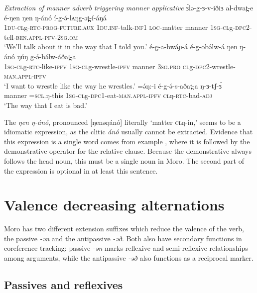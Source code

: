 \ea \textit{Extraction of manner adverb triggering manner applicative}
\ea \gll ɜ́lə-g-ɜ-v-iðiɜ al-dwat̪-e é-ŋen {ŋen ŋ-ánó} í-g-ə́-lʌŋg-ət̪-í-áŋá	\\
 	1\textsc{du-cl}g-\textsc{rtc}-\textsc{prog}-\textsc{future.aux} \textsc{1du.inf-}talk-\textsc{inf1} \textsc{loc}-matter manner \textsc{1sg-cl}g-\textsc{dpc2}-tell-\textsc{ben.appl-pfv-2sg.om}\\
\glt `We'll talk about it in the way that I told you.'
\ex \gll é-g-a-bwáɲ-á é-g-obə́lw-á {ŋen ŋ-ánó} ŋúŋ g-ə́-bə́lw-áðat̪-a\\
\textsc{1sg-cl}g-\textsc{rtc}-like-\textsc{ipfv} \textsc{1sg}-\textsc{cl}g-{wrestle}-\textsc{ipfv} manner \textsc{3sg.pro} \textsc{cl}g-\textsc{dpc2}-wrestle-\textsc{man.appl-ipfv}\\
\glt `I want to wrestle like the way he wrestles.'
\ex {} =ə́ŋ:-i é-g-ə́-s-aðat̪-a ŋ-ɜ-tʃ-ɜ́\\
manner =\textsc{scl}.ŋ-this \textsc{1sg-cl}g-\textsc{dpc1}-eat-\textsc{man.appl-ipfv} \textsc{cl}ŋ-\textsc{rtc}-bad-\textsc{adj}\\
\glt 		`The way that I eat is bad.' \label{ex:ch12:eatway}
\z 
\z

The \textit{ŋen ŋ-ánó}, pronounced [ŋenəŋánó] literally `matter \textsc{cl}ŋ-in,' seems to be a idiomatic expression, as the clitic \textit{ánó} usually cannot be extracted. Evidence that this expression is a single word comes from example , where it is followed by the demonstrative operator for the relative clause. Because the demonstrative always follows the head noun, this must be a single noun in Moro. The second part of the expression is optional in at least this sentence. 



\section{Valence decreasing alternations}\label{sec:ch12:decreasing}

Moro has two different extension suffixes which reduce the valence of the verb, the passive \textit{-ən} and the antipassive \textit{-əð}. Both also have secondary functions in coreference tracking: passive \textit{-ən} marks reflexive and semi-reflexive relationships among arguments, while the antipassive \textit{-əð} also functions as a reciprocal marker.

\subsection{Passives and reflexives}\label{sec:ch12:passive}

